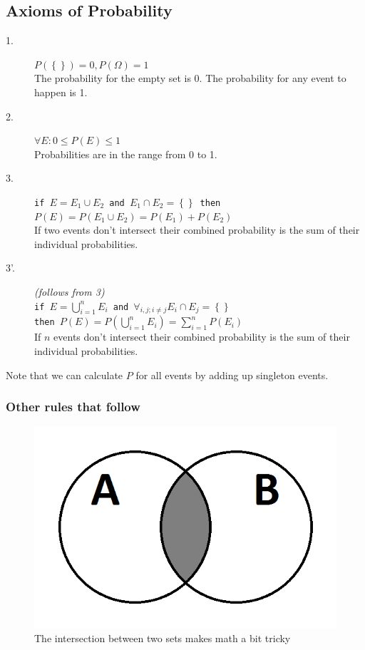 \documentclass[../main/Notes.tex]{subfiles}
\begin{document}
\subsection{Axioms of Probability}
\begin{description}
	\item[1.] $P(\left\{\right\}) = 0, P(\Omega) = 1$
            \\ The probability for the empty set is 0. The probability for any event to happen is 1.
  \item[2.] $\forall E: 0 \leq P(E) \leq 1$
            \\ Probabilities are in the range from 0 to 1.
  \item[3.] \texttt{if $E = E_1 \cup E_2$ and $E_1 \cap E_2 = \left\{ \right\}$
            then $P(E) = P(E_1 \cup E_2) = P(E_1) + P(E_2)$}
            \\ If two events don't intersect their combined probability is the sum of their individual probabilities.
  \item[3'.] \textit{(follows from 3)} \\
            \texttt{if $E = \bigcup\limits_{i=1}^n E_i$ and $\forall_{i, j; i \neq j} E_i \cap E_j = \left\{ \right\}$ \\
            then $P(E) = P\left(\bigcup\limits_{i=1}^n E_i\right) = \sum\limits_{i=1}^{n}{P\left(E_i\right)}$}
            \\ If $n$ events don't intersect their combined probability is the sum of their individual probabilities.
\end{description}

Note that we can calculate $P$ for all events by adding up singleton events.

\subsubsection*{Other rules that follow}
\begin{figure}[ht]
  \begin{center}
    \includegraphics[scale=0.3]{../images/venn_diagram_a_intersects_b}
    \caption{The intersection between two sets makes math a bit tricky}
    \label{fig:venn_a_inter_b}
  \end{center}
\end{figure}
\end{document}
